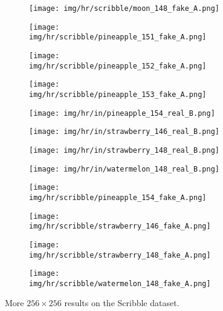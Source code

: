 \documentclass[10pt,twocolumn,letterpaper]{article}
\begin{document}
\begin{figure*}[tbp]
\begin{center}
\begin{subfigure}[b]{\hrwidth\linewidth}
  \texttt{[image: img/hr/scribble/moon\_148\_fake\_A.png]}
  \end{subfigure}
  \begin{subfigure}[b]{\hrwidth\linewidth}
  \texttt{[image: img/hr/scribble/pineapple\_151\_fake\_A.png]}
  \end{subfigure}
\begin{subfigure}[b]{\hrwidth\linewidth}
  \texttt{[image: img/hr/scribble/pineapple\_152\_fake\_A.png]}
  \end{subfigure}
  \begin{subfigure}[b]{\hrwidth\linewidth}
  \texttt{[image: img/hr/scribble/pineapple\_153\_fake\_A.png]}
  \end{subfigure}
  
\begin{subfigure}[b]{\hrwidth\linewidth}
  \texttt{[image: img/hr/in/pineapple\_154\_real\_B.png]}
  \end{subfigure}
  \begin{subfigure}[b]{\hrwidth\linewidth}
  \texttt{[image: img/hr/in/strawberry\_146\_real\_B.png]}
  \end{subfigure}
\begin{subfigure}[b]{\hrwidth\linewidth}
  \texttt{[image: img/hr/in/strawberry\_148\_real\_B.png]}
  \end{subfigure}
  \begin{subfigure}[b]{\hrwidth\linewidth}
  \texttt{[image: img/hr/in/watermelon\_148\_real\_B.png]}
  \end{subfigure}
  
\begin{subfigure}[b]{\hrwidth\linewidth}
  \texttt{[image: img/hr/scribble/pineapple\_154\_fake\_A.png]}
  \end{subfigure}
  \begin{subfigure}[b]{\hrwidth\linewidth}
  \texttt{[image: img/hr/scribble/strawberry\_146\_fake\_A.png]}
  \end{subfigure}
\begin{subfigure}[b]{\hrwidth\linewidth}
  \texttt{[image: img/hr/scribble/strawberry\_148\_fake\_A.png]}
  \end{subfigure}
  \begin{subfigure}[b]{\hrwidth\linewidth}
  \texttt{[image: img/hr/scribble/watermelon\_148\_fake\_A.png]}
  \end{subfigure}
  
\end{center}
\caption{More $256\times 256$ results on the Scribble dataset.}
 \label{fig:hr_scribble}
\end{figure*}
\end{document}
